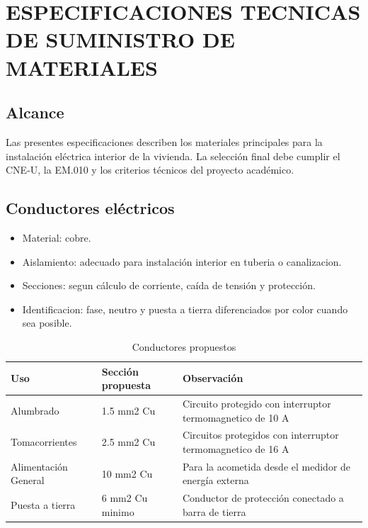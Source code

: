 \chapter{ESPECIFICACIONES TECNICAS DE SUMINISTRO DE MATERIALES}

\section{Alcance}

Las presentes especificaciones describen los materiales principales para la instalación eléctrica interior de la vivienda. La selección final debe cumplir el CNE-U, la EM.010 y los criterios técnicos del proyecto académico.

\section{Conductores eléctricos}

\begin{itemize}
  \item Material: cobre.
  \item Aislamiento: adecuado para instalación interior en tuberia o canalizacion.
  \item Secciones: segun cálculo de corriente, caída de tensión y protección.
  \item Identificacion: fase, neutro y puesta a tierra diferenciados por color cuando sea posible.
\end{itemize}

\begin{landscape}
\begin{table}[H]
\centering
\small
\caption{Conductores propuestos}
\label{tab:conductores-propuestos}
\begin{tabularx}{\textwidth}{L{3.4cm}L{3.3cm}Y}
\toprule
\textbf{Uso} & \textbf{Sección propuesta} & \textbf{Observación} \\
\midrule
Alumbrado & 1.5 mm2 Cu & Circuito protegido con interruptor termomagnetico de 10 A \\
Tomacorrientes & 2.5 mm2 Cu & Circuitos protegidos con interruptor termomagnetico de 16 A \\
Alimentación General & 10 mm2 Cu & Para la acometida desde el medidor de energía externa \\
Puesta a tierra & 6 mm2 Cu minimo & Conductor de protección conectado a barra de tierra \\
\bottomrule
\end{tabularx}
\end{table}
\end{landscape}

